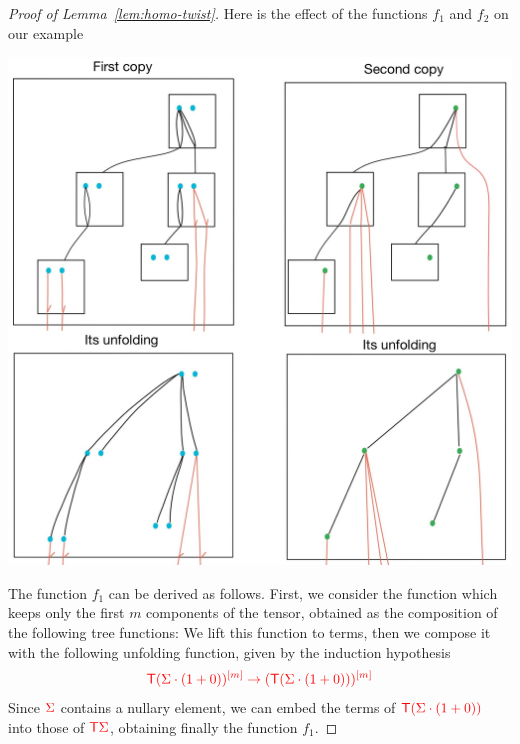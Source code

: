 \begin{proof}[Proof of Lemma~\ref{lem:homo-twist}]
Here is the effect of the functions $f_1$ and $f_2$ on our example
\begin{center}
\includegraphics[scale=.15]{MyPic30.jpg}
\end{center}
 The function $f_1$ can be derived as follows. First, we consider the function which keeps only the first $m$ components of the tensor, obtained as the composition of the following tree functions:
We lift this function to terms, then we compose it with the following unfolding function, given by the induction hypothesis
\begin{align*}
\ranked{\tmonad \mati m {(\Sigma\cdot (1+0))} \to \mati m {(\tmonad (\Sigma\cdot (1+0)))}}
\end{align*}
Since $\rSigma$ contains a nullary element, we can embed the terms of  $\ranked{\tmonad (\Sigma\cdot (1+0))}$ into those of $\ranked{\tmonad \Sigma}$, obtaining finally the function $f_1$.



\end{proof}
